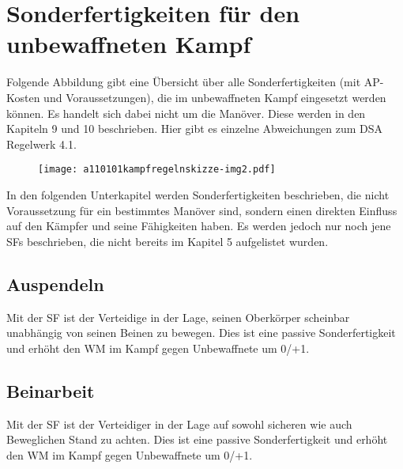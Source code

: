 %


\chapter[Sonderfertigkeiten für den unbewaffneten Kampf]{\color{black}
Sonderfertigkeiten für den unbewaffneten Kampf}
{\sffamily\color{black}
Folgende Abbildung gibt eine Übersicht über alle Sonderfertigkeiten (mit
AP-Kosten und Voraussetzungen), die im unbewaffneten Kampf eingesetzt
werden können. Es handelt sich dabei nicht um die Manöver. Diese werden
in den Kapiteln 9 und 10 beschrieben. Hier gibt es einzelne
Abweichungen zum DSA Regelwerk 4.1.}


\bigskip



\begin{figure}
\centering
\texttt{[image: a110101kampfregelnskizze-img2.pdf]}
\end{figure}
{\sffamily\color{black}
In den folgenden Unterkapitel werden Sonderfertigkeiten beschrieben, die
nicht Voraussetzung für ein bestimmtes Manöver sind, sondern einen
direkten Einfluss auf den Kämpfer und seine Fähigkeiten haben. Es
werden jedoch nur noch jene SFs beschrieben, die nicht bereits im
Kapitel 5 aufgelistet wurden.}

\section[Auspendeln (Raufen oder Ringen)]{Auspendeln
}
{\sffamily\color{black}
Mit der SF  ist der Verteidige in der
Lage, seinen Oberkörper scheinbar unabhängig von seinen Beinen zu
bewegen. Dies ist eine passive Sonderfertigkeit und erhöht den WM im
Kampf gegen Unbewaffnete um 0/+1.}

\section[Beinarbeit (Raufen oder Ringen)]{Beinarbeit
}
{\sffamily\color{black}
Mit der SF  ist der Verteidiger in der
Lage auf sowohl sicheren wie auch Beweglichen Stand zu achten. Dies ist
eine passive Sonderfertigkeit und erhöht den WM im Kampf gegen
Unbewaffnete um 0/+1.}

